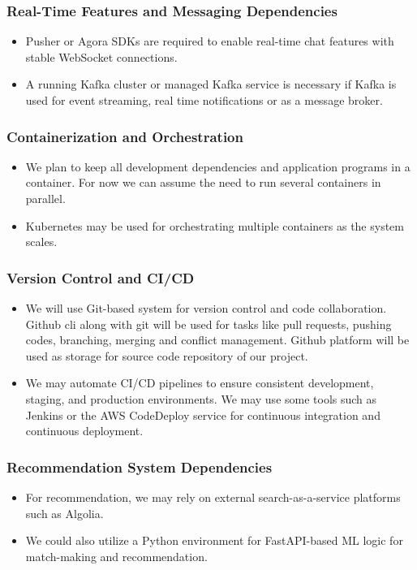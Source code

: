 \documentclass{FastFyp}
\begin{document}
\subsubsection{Real-Time Features and Messaging Dependencies}
\begin{itemize}
    \item Pusher or Agora SDKs are required to enable real-time chat features with stable WebSocket connections.
    \item A running Kafka cluster or managed Kafka service is necessary if Kafka is used for event streaming, real time notifications or as a message broker.

\end{itemize}

\subsubsection{Containerization and Orchestration}

\begin{itemize}
    \item We plan to keep all development dependencies and application programs in a container. For now we can assume the need to run several containers in parallel.

    \item Kubernetes may be used for orchestrating multiple containers as the system scales.

\end{itemize}

\subsubsection{Version Control and CI/CD}
\begin{itemize}
    \item We will use Git-based system for version control and code collaboration. Github cli along with git will be used for tasks like pull requests, pushing codes, branching, merging and conflict management. Github platform will be used as storage for source code repository of our project. 
    \item We may automate CI/CD pipelines to ensure consistent development, staging, and production environments. We may use some tools such as Jenkins or the AWS CodeDeploy service for continuous integration and continuous deployment. 


\end{itemize}


\subsubsection{Recommendation System Dependencies} 
\begin{itemize}
    \item For recommendation, we may rely on external search-as-a-service platforms such as Algolia.
    \item We could also utilize a Python environment for FastAPI-based ML logic for match-making and recommendation.
\end{itemize}
\end{document}
